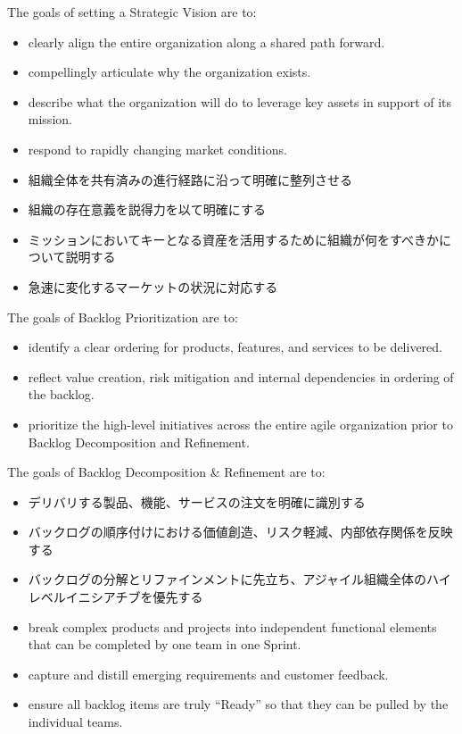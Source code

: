 \documentclass[12pt,a4paper,parskip=full]{scrartcl}
\begin{document}
The goals of setting a Strategic Vision are to:
\begin{itemize}
\item clearly align the entire organization along a shared path forward.
\item compellingly articulate why the organization exists.
\item describe what the organization will do to leverage key assets in
support of its mission.
\item respond to rapidly changing market conditions.
\end{itemize}
\fi
\begin{itemize}
\item 組織全体を共有済みの進行経路に沿って明確に整列させる
\item 組織の存在意義を説得力を以て明確にする
\item ミッションにおいてキーとなる資産を活用するために組織が何をすべきかについて説明する
\item 急速に変化するマーケットの状況に対応する
\end{itemize}
The goals of Backlog Prioritization are to:
\begin{itemize}
\item identify a clear ordering for products, features, and services to be
delivered.
\item reflect value creation, risk mitigation and internal dependencies in
ordering of the backlog.
\item prioritize the high-level initiatives across the entire agile
organization prior to Backlog Decomposition and Refinement.
\end{itemize}
The goals of Backlog Decomposition \& Refinement are to:
\fi
\begin{itemize}
\item デリバリする製品、機能、サービスの注文を明確に識別する
\item バックログの順序付けにおける価値創造、リスク軽減、内部依存関係を反映する
\item バックログの分解とリファインメントに先立ち、アジャイル組織全体のハイレベルイニシアチブを優先する
\end{itemize}
\begin{itemize}
\item break complex products and projects into independent functional
elements that can be completed by one team in one Sprint.
\item capture and distill emerging requirements and customer feedback.
\item ensure all backlog items are truly ``Ready'' so that they can be
pulled by the individual teams.
\end{itemize}
\end{document}
